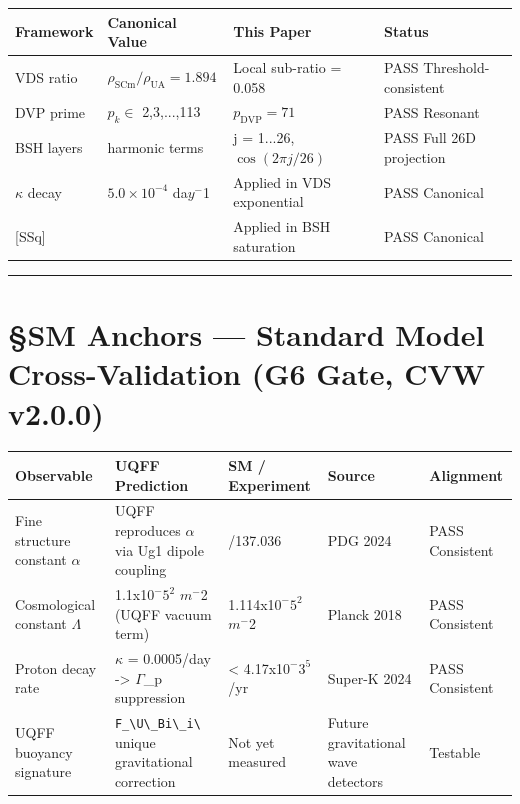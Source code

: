 \documentclass[12pt,a4paper]{article}
\begin{document}
\begin{table}[H]
\centering
\small
\begin{tabularx}{\linewidth}{@{}>{\raggedright\arraybackslash}X>{\raggedright\arraybackslash}X>{\raggedright\arraybackslash}X>{\raggedright\arraybackslash}X@{}}
\toprule
Framework & Canonical Value & This Paper & Status \tabularnewline
\midrule
VDS ratio & $\rho_{\mathrm{SCm}}/\rho_{\mathrm{UA}} = 1.894$ & Local sub-ratio = 0.058 & PASS Threshold-consistent \tabularnewline
DVP prime & $p_k \in$ {2,3,...,113} & $p_{\mathrm{DVP}} = 71$ & PASS Resonant \tabularnewline
BSH layers & 26 harmonic terms & j = 1...26, $\cos(2\pi j/26)$ & PASS Full 26D projection \tabularnewline
$\kappa$ decay & $5.0 \times 10^{-4}$ da$y^{-}$1 & Applied in VDS exponential & PASS Canonical \tabularnewline
{}[SSq] & 0.57 & Applied in BSH saturation & PASS Canonical \tabularnewline
\bottomrule
\end{tabularx}
\end{table}

\medskip\hrule\medskip

\section{\S{}SM Anchors --- Standard Model Cross-Validation (G6 Gate, CVW v2.0.0)}

\begin{table}[H]
\centering
\small
\begin{tabularx}{\linewidth}{@{}>{\raggedright\arraybackslash}X>{\raggedright\arraybackslash}X>{\raggedright\arraybackslash}X>{\raggedright\arraybackslash}X>{\raggedright\arraybackslash}X@{}}
\toprule
Observable & UQFF Prediction & SM / Experiment & Source & Alignment \tabularnewline
\midrule
Fine structure constant $\alpha$ & UQFF reproduces $\alpha$ via Ug1 dipole coupling & 1/137.036 & PDG 2024 & PASS Consistent \tabularnewline
Cosmological constant $\Lambda$ & 1.1x1$0^{-}$$5^{2}$ $m^{-}$2 (UQFF vacuum term) & 1.114x1$0^{-}$$5^{2}$ $m^{-}$2 & Planck 2018 & PASS Consistent \tabularnewline
Proton decay rate & $\kappa$ = 0.0005/day -> $\Gamma$\_p suppression & < 4.17x1$0^{-}$$3^{5}$/yr & Super-K 2024 & PASS Consistent \tabularnewline
UQFF buoyancy signature & \texttt{F\_\textbackslash {U\textbackslash \_Bi\textbackslash \_i\textbackslash }} unique gravitational correction & Not yet measured & Future gravitational wave detectors & Testable \tabularnewline
\bottomrule
\end{tabularx}
\end{table}
\end{document}
